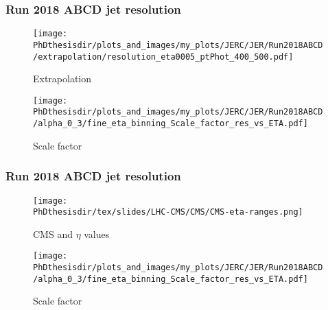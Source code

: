\begin{frame}
\frametitle{Run 2018 ABCD jet resolution}
\begin{minipage}{.45\textwidth}
\begin{figure}
\texttt{[image: \\PhDthesisdir/plots\_and\_images/my\_plots/JERC/JER/Run2018ABCD/extrapolation/resolution\_eta0005\_ptPhot\_400\_500.pdf]}
\caption{Extrapolation}
\end{figure}
\end{minipage}
\hfill
\begin{minipage}{.45\textwidth}
\begin{figure}
\texttt{[image: \\PhDthesisdir/plots\_and\_images/my\_plots/JERC/JER/Run2018ABCD/alpha\_0\_3/fine\_eta\_binning\_Scale\_factor\_res\_vs\_ETA.pdf]}
\caption{Scale factor}
\end{figure}
\end{minipage}
\end{frame}

\begin{frame}\addtocounter{framenumber}{-1}
\frametitle{Run 2018 ABCD jet resolution}
\begin{minipage}{.45\textwidth}
\begin{figure}
\texttt{[image: \\PhDthesisdir/tex/slides/LHC-CMS/CMS/CMS-eta-ranges.png]}
\caption{CMS and $\eta$ values}
\end{figure}
\end{minipage}
\hfill
\begin{minipage}{.45\textwidth}
\begin{figure}
\texttt{[image: \\PhDthesisdir/plots\_and\_images/my\_plots/JERC/JER/Run2018ABCD/alpha\_0\_3/fine\_eta\_binning\_Scale\_factor\_res\_vs\_ETA.pdf]}
\caption{Scale factor}
\end{figure}
\end{minipage}
\end{frame}
